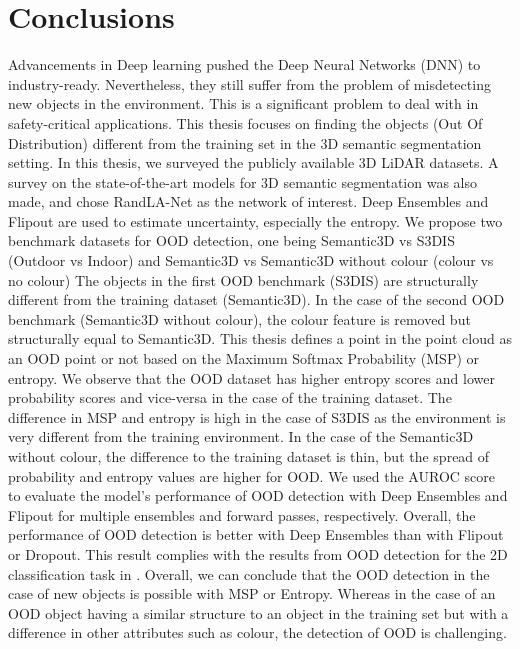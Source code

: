 

    \chapter{Conclusions}
    Advancements in Deep learning pushed the Deep Neural Networks (DNN) to industry-ready.
    Nevertheless, they still suffer from the problem of misdetecting new objects in the environment.
    This is a significant problem to deal with in safety-critical applications.
    This thesis focuses on finding the objects (Out Of Distribution) different from the training set in the 3D semantic segmentation setting.
    In this thesis, we surveyed the publicly available 3D LiDAR datasets.
    A survey on the state-of-the-art models for 3D semantic segmentation was also made, and chose RandLA-Net as the network of interest.
    Deep Ensembles and Flipout are used to estimate uncertainty, especially the entropy. 
    We propose two benchmark datasets for OOD detection, one being Semantic3D vs S3DIS (Outdoor vs Indoor) and Semantic3D vs Semantic3D without colour (colour vs no colour)
    The objects in the first OOD benchmark (S3DIS) are structurally different from the training dataset (Semantic3D).
    In the case of the second OOD benchmark (Semantic3D without colour), the colour feature is removed but structurally equal to Semantic3D.
    This thesis defines a point in the point cloud as an OOD point or not based on the Maximum Softmax Probability (MSP) or entropy.
    We observe that the OOD dataset has higher entropy scores and lower probability scores and vice-versa in the case of the training dataset.
    The difference in MSP and entropy is high in the case of S3DIS as the environment is very different from the training environment.
    In the case of the Semantic3D without colour, the difference to the training dataset is thin, but the spread of probability and entropy values are higher for OOD.
    We used the AUROC score to evaluate the model's performance of OOD detection with Deep Ensembles and Flipout for multiple ensembles and forward passes, respectively.
    Overall, the performance of OOD detection is better with Deep Ensembles than with Flipout or Dropout.
    This result complies with the results from OOD detection for the 2D classification task in \cite{lakshminarayanan2016simple}.
    Overall, we can conclude that the OOD detection in the case of new objects is possible with MSP or Entropy.
    Whereas in the case of an OOD object having a similar structure to an object in the training set but with a difference in other attributes such as colour, the detection of OOD is challenging.
    
